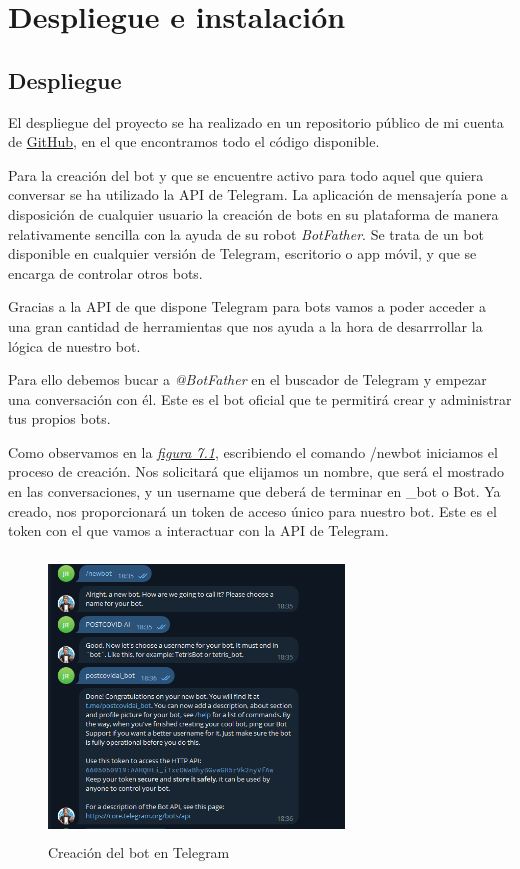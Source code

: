 \chapter{Despliegue e instalación}\vspace{0.3cm}


\section{Despliegue}

El despliegue del proyecto se ha realizado en un repositorio público de mi cuenta de \href{https://github.com/juantiog22}{GitHub}, en el que encontramos todo el código disponible. \vspace{0.3cm}

Para la creación del bot y que se encuentre activo para todo aquel que quiera conversar se ha utilizado la API de Telegram. La aplicación de mensajería pone a disposición de cualquier usuario la creación de bots en su plataforma de manera relativamente sencilla con la ayuda de su robot \textit{BotFather}. Se trata de un bot disponible en cualquier versión de Telegram, escritorio o app móvil, y que se encarga de controlar otros bots.

Gracias a la API de que dispone Telegram para bots vamos a poder acceder a una gran cantidad de herramientas que nos ayuda a la hora de desarrrollar la lógica de nuestro bot.


Para ello debemos bucar a \textit{@BotFather} en el buscador de Telegram y empezar una conversación con él. Este es el bot oficial que te permitirá crear y administrar tus propios bots. 

Como observamos en la \textit{\hyperref[fig:creacion-bot]{figura 7.1}}, escribiendo el comando /newbot iniciamos el proceso de creación. Nos solicitará que elijamos un nombre, que será el mostrado en las conversaciones, y un username que deberá de terminar en \_bot o Bot. Ya creado, nos proporcionará un token de acceso único para nuestro bot. Este es el token con el que vamos a interactuar con la API de Telegram. \vspace{2cm}

\begin{figure}[!ht]
    \centering
    \includegraphics[width=0.7\textwidth, height=7.5cm]{imagenes/bot_creation.png}
    \caption{ Creación del bot en Telegram }
    \label{fig:creacion-bot}
\end{figure}


